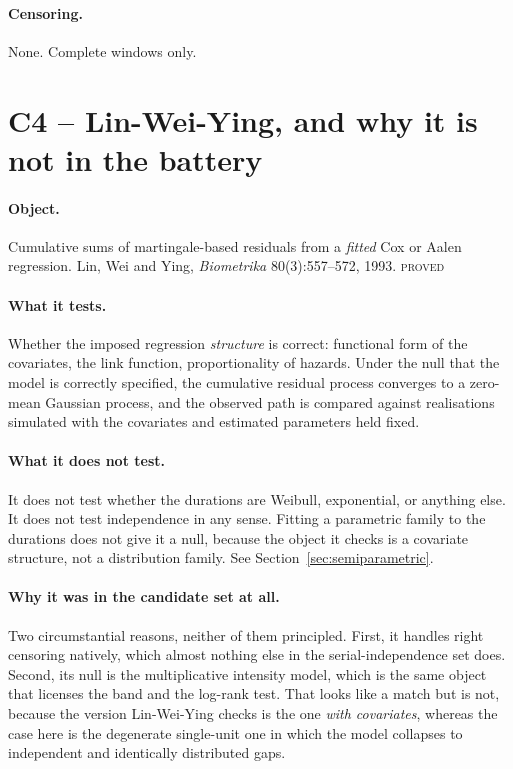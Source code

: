 \documentclass[11pt,a4paper]{article}
\newcommand{\PROVED}{\textsc{\textcolor{blue!55!black}{proved}}}
\begin{document}
\paragraph{Censoring.} None. Complete windows only.

\section{C4 -- Lin-Wei-Ying, and why it is not in the battery}
\label{sec:lwy}

\paragraph{Object.} Cumulative sums of martingale-based residuals from a \emph{fitted}
Cox or Aalen regression. Lin, Wei and Ying, \emph{Biometrika} 80(3):557--572, 1993.
\PROVED

\paragraph{What it tests.} Whether the imposed regression \emph{structure} is correct:
functional form of the covariates, the link function, proportionality of hazards. Under
the null that the model is correctly specified, the cumulative residual process converges
to a zero-mean Gaussian process, and the observed path is compared against realisations
simulated with the covariates and estimated parameters held fixed.

\paragraph{What it does not test.} It does not test whether the durations are Weibull,
exponential, or anything else. It does not test independence in any sense. Fitting a
parametric family to the durations does not give it a null, because the object it checks
is a covariate structure, not a distribution family. See
Section~\ref{sec:semiparametric}.

\paragraph{Why it was in the candidate set at all.} Two circumstantial reasons, neither
of them principled. First, it handles right censoring natively, which almost nothing
else in the serial-independence set does. Second, its null is the multiplicative
intensity model, which is the same object that licenses the band and the log-rank test.
That looks like a match but is not, because the version Lin-Wei-Ying checks is the one
\emph{with covariates}, whereas the case here is the degenerate single-unit one in which
the model collapses to independent and identically distributed gaps.
\end{document}

